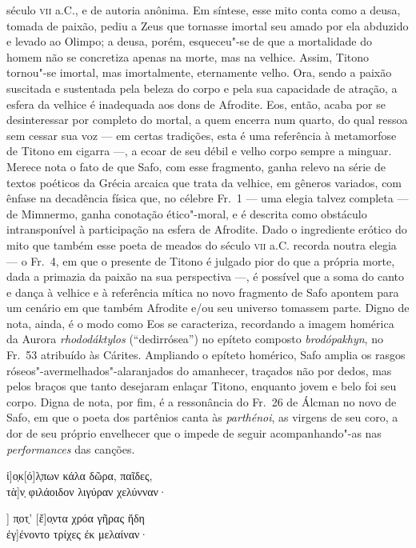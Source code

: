 {século \textsc{vii} a.C., e de autoria anônima. Em síntese, esse mito conta como a
deusa, tomada de paixão, pediu a Zeus que tornasse imortal seu amado por ela abduzido e levado ao Olimpo; a deusa,
porém, esqueceu"-se de que a mortalidade do homem não se concretiza apenas na
morte, mas na velhice. Assim, Titono tornou"-se imortal, mas imortalmente,
eternamente velho. Ora, sendo a paixão suscitada e sustentada pela
beleza do corpo e pela sua capacidade de atração, a esfera da velhice é
inadequada aos dons de Afrodite. Eos, então, acaba por se desinteressar por
completo do mortal, a quem encerra num quarto, do qual ressoa sem cessar sua
voz --- em certas tradições, esta é uma referência à metamorfose de Titono em
cigarra ---, a ecoar de seu débil e velho corpo sempre a minguar. Merece nota o fato de
que Safo, com esse fragmento, ganha relevo na série de textos poéticos da
Grécia arcaica que trata da velhice, em gêneros variados, com ênfase na
decadência física que, no célebre Fr.~1 --- uma elegia talvez completa --- de
Mimnermo, ganha conotação ético"-moral, e é descrita como obstáculo
intransponível à participação na esfera de Afrodite.
Dado o ingrediente erótico do mito que também esse poeta de meados do século
\textsc{vii} a.C. recorda noutra elegia --- o Fr.~4, em que o presente de Titono é
julgado pior do que a própria morte, dada a primazia da paixão na sua perspectiva
---, é possível que a soma do canto e dança à
velhice e à referência mítica no novo fragmento de Safo apontem para um cenário
em que também Afrodite e/ou seu universo tomassem parte. Digno de nota, ainda,
é o modo como Eos se caracteriza, recordando a imagem homérica da Aurora
\textit{rhododáktylos} (``dedirrósea'') no
epíteto composto \textit{brodópakhyn}, no Fr.~53 atribuído às Cárites.
Ampliando o epíteto homérico, Safo amplia os rasgos
róseos"-avermelhados"-alaranjados do amanhecer, traçados não por dedos, mas pelos
braços que tanto desejaram enlaçar Titono, enquanto jovem e belo foi seu
corpo. Digna de nota, por fim, é a ressonância do Fr.~26 de Álcman no novo de Safo, em que o poeta dos partênios canta às \textit{parthénoi}, as virgens de seu coro, a dor de seu próprio envelhecer que o impede de seguir acompanhando"-as nas \textit{performances} das canções.

\begin{gkverse}
ἰ]ο̣κ[ό]λ̣πων κάλα δῶρα, παῖδες,\\
        τὰ]ν̣ φιλάοιδον λιγύραν χελύνναν·

] π̣οτ̣’ [ἔ]ο̣ντα χρόα γῆρας ἤδη\\
         ἐγ]ένοντο τρίχες ἐκ μελαίναν·


\end{gkverse}}
